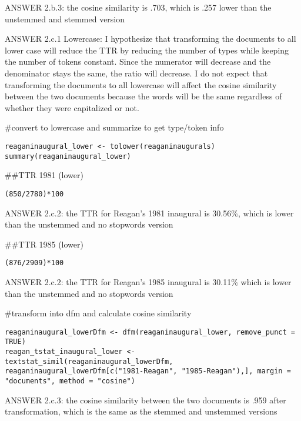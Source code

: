 \documentclass[
]{article}
\begin{document}
ANSWER 2.b.3: the cosine similarity is .703, which is .257 lower than
the unstemmed and stemmed version

ANSWER 2.c.1 Lowercase: I hypothesize that transforming the documents to
all lower case will reduce the TTR by reducing the number of types while
keeping the number of tokens constant. Since the numerator will decrease
and the denominator stays the same, the ratio will decrease. I do not
expect that transforming the documents to all lowercase will affect the
cosine similarity between the two documents because the words will be
the same regardless of whether they were capitalized or not.

\#convert to lowercase and summarize to get type/token info

\begin{verbatim}
reaganinaugural_lower <- tolower(reaganinaugurals)
summary(reaganinaugural_lower)
\end{verbatim}

\#\#TTR 1981 (lower)

\begin{verbatim}
(850/2780)*100
\end{verbatim}

ANSWER 2.c.2: the TTR for Reagan's 1981 inaugural is 30.56\%, which is
lower than the unstemmed and no stopwords version

\#\#TTR 1985 (lower)

\begin{verbatim}
(876/2909)*100
\end{verbatim}

ANSWER 2.c.2: the TTR for Reagan's 1985 inaugural is 30.11\% which is
lower than the unstemmed and no stopwords version

\#transform into dfm and calculate cosine similarity

\begin{verbatim}
reaganinaugural_lowerDfm <- dfm(reaganinaugural_lower, remove_punct = TRUE)
reagan_tstat_inaugural_lower <- textstat_simil(reaganinaugural_lowerDfm, reaganinaugural_lowerDfm[c("1981-Reagan", "1985-Reagan"),], margin = "documents", method = "cosine")
\end{verbatim}

ANSWER 2.c.3: the cosine similarity between the two documents is .959
after transformation, which is the same as the stemmed and unstemmed
versions
\end{document}
